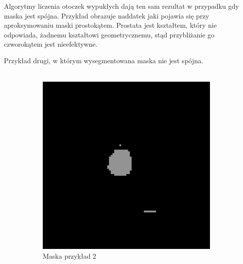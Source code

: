 \documentclass[a4paper,11pt,twoside]{report}
\theoremstyle{definition}
\begin{document}
Algorytmy liczenia otoczek wypukłych dają ten sam rezultat w przypadku gdy maska jest spójna. Przykład obrazuje naddatek jaki pojawia się przy aproksymowaniu maski prostokątem. Prostata jest kształtem, który nie odpowiada, żadnemu kształtowi geometrycznemu, stąd przybliżanie go czworokątem jest nieefektywne.

Przykład drugi, w którym wysegmentowana maska nie jest spójna. \\ \\

\begin{figure}[htb]
	\centering %
	\begin{subfigure}{0.25\textwidth}
		\includegraphics[width=\linewidth]{Mask/2/mask.png}
		\caption{Maska przykład 2}
		\label{fig:1}
	\end{subfigure}\hfil %
	\begin{subfigure}{0.25\textwidth}

\end{subfigure}
\end{figure}
\end{document}
